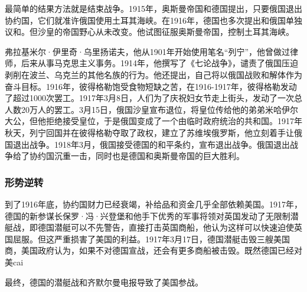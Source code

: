 \documentclass{article}
\begin{document}
最简单的结果方法就是结束战争。1915年，奥斯曼帝国和德国提出，只要俄国退出协约国，它们就准许俄国使用土耳其海峡。在1916年，德国也多次提出和俄国单独议和。但沙皇的帝国野心从未改变。他试图征服奥斯曼帝国，控制土耳其海峡。

弗拉基米尔·伊里奇·乌里扬诺夫，他从1901年开始使用笔名“列宁”，他曾做过律师，后来从事马克思主义事务。1914年，他撰写了《七论战争》，谴责了俄国压迫剥削在波兰、乌克兰的其他名族的行为。他还提出，自己将以俄国战败和解体作为奋斗目标。1916年，彼得格勒饱受食物短缺之苦，在1916-1917年，彼得格勒发动了超过1000次罢工。1917年3月8日，人们为了庆祝妇女节走上街头，发动了一次总人数20万人的罢工。3月15日，俄国沙皇宣布退位，将皇位传给他的弟弟米哈伊尔大公，但他拒绝接受皇位，于是俄国变成了一个由临时政府统治的共和国。1917年秋天，列宁回国并在彼得格勒夺取了政权，建立了苏维埃俄罗斯，他立刻着手让俄国退出战争。1918年3月，俄国接受德国的和平条约，宣布退出战争。俄国退出战争给了协约国沉重一击，同时也是德国和奥斯曼帝国的巨大胜利。
\subsubsection{形势逆转}
到了1916年底，协约国财力已经衰竭，补给品和资金几乎全部依赖美国。1917年，德国的新参谋长保罗·冯·兴登堡和他手下优秀的军事将领对英国发动了无限制潜艇战，即德国潜艇可以不先警告，直接打击英国商船，他认为这样可以快速迫使英国屈服。但这严重损害了美国的利益。1917年3月17日，德国潜艇击毁三艘美国商，美国政府认为，如果不对德国宣战，还会有更多商船被击毁。既然德国已经对美cai

最终，德国的潜艇战和齐默尔曼电报导致了美国参战。
\end{document}
